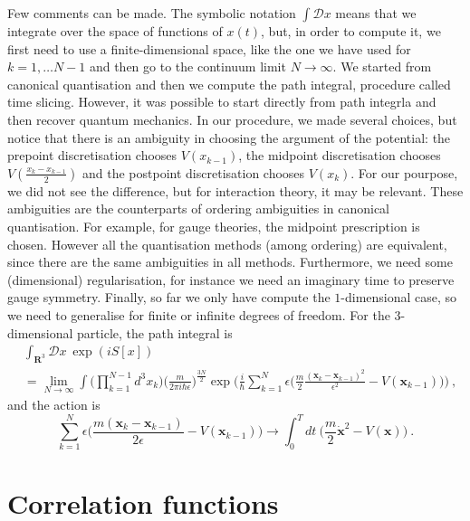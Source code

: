    Few comments can be made. The symbolic notation $\int \mathcal D x$ means that we integrate over the space of functions of $x(t)$, but, in order to compute it, we first need to use a finite-dimensional space, like the one we have used for $k = 1, \ldots N-1$ and then go to the continuum limit $N \rightarrow \infty$. We started from canonical quantisation and then we compute the path integral, procedure called time slicing. However, it was possible to start directly from path integrla and then recover quantum mechanics. In our procedure, we made several choices, but notice that there is an ambiguity in choosing the argument of the potential: the prepoint discretisation chooses $V(x_{k-1})$, the midpoint discretisation chooses $V(\frac{x_k - x_{k-1}}{2})$ and the postpoint discretisation chooses $V(x_{k})$. For our pourpose, we did not see the difference, but for interaction theory, it may be relevant. These ambiguities are the counterparts of ordering ambiguities in canonical quantisation. For example, for gauge theories, the midpoint prescription is chosen. However all the quantisation methods (among ordering) are equivalent, since there are the same ambiguities in all methods. Furthermore, we need some (dimensional) regularisation, for instance we need an imaginary time to preserve gauge symmetry. Finally, so far we only have compute the $1$-dimensional case, so we need to generalise for finite or infinite degrees of freedom. For the $3$-dimensional particle, the path integral is
    \begin{equation*}
    \begin{aligned}
        & \int_{\mathbf R^3} \mathcal D x ~ \exp (i S[x]) \\ & = \lim_{N \rightarrow \infty} \int \Big (\prod_{k=1}^{N-1} d^3 x_k \Big ) \Big (\frac{m}{2\pi i \hbar \epsilon} \Big)^{\frac{3N}{2}} \exp \Big (\frac{i}{\hbar} \sum_{k=1}^{N} \epsilon \Big (\frac{m}{2} \frac{(\mathbf x_k - \mathbf x_{k-1})^2}{\epsilon^2} - V (\mathbf x_{k-1}) \Big )  \Big )  ~,
    \end{aligned}
    \end{equation*}
    and the action is 
    \begin{equation*}
        \sum_{k=1}^N \epsilon \Big ( \frac{m (\mathbf x_k - \mathbf x_{k-1})}{2 \epsilon}  - V(\mathbf x_{k-1}) \Big) \rightarrow \int_0^T dt~ \Big ( \frac{m}{2} \mathbf{\dot x}^2 - V(\mathbf x) \Big) ~.
    \end{equation*}

\section{Correlation functions}

